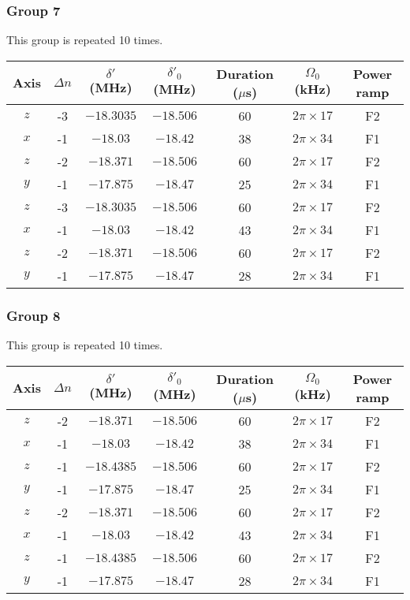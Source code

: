 \documentclass[aps,secnumarabic,amsmath,amssymb]{revtex4}
\begin{document}
\newpage
\subsubsection{Group 7}
This group is repeated 10 times.
\begin{center}
  \begin{tabular}{|c|c|c|c|c|c|c|}
    \hline
    Axis&$\Delta n$&$\delta'$ (MHz)&$\delta'_0$ (MHz)&Duration ($\mu$s)& $\Omega_0$ (kHz)&Power ramp\\\hline
    $z$&-3&$-18.3035$&$-18.506$&60&$2\pi\times17$&F2\\\hline
    $x$&-1&$-18.03$&$-18.42$&38&$2\pi\times34$&F1\\\hline
    $z$&-2&$-18.371$&$-18.506$&60&$2\pi\times17$&F2\\\hline
    $y$&-1&$-17.875$&$-18.47$&25&$2\pi\times34$&F1\\\hline
    $z$&-3&$-18.3035$&$-18.506$&60&$2\pi\times17$&F2\\\hline
    $x$&-1&$-18.03$&$-18.42$&43&$2\pi\times34$&F1\\\hline
    $z$&-2&$-18.371$&$-18.506$&60&$2\pi\times17$&F2\\\hline
    $y$&-1&$-17.875$&$-18.47$&28&$2\pi\times34$&F1\\\hline
  \end{tabular}
\end{center}
\subsubsection{Group 8}
This group is repeated 10 times.
\begin{center}
  \begin{tabular}{|c|c|c|c|c|c|c|}
    \hline
    Axis&$\Delta n$&$\delta'$ (MHz)&$\delta'_0$ (MHz)&Duration ($\mu$s)& $\Omega_0$ (kHz)&Power ramp\\\hline
    $z$&-2&$-18.371$&$-18.506$&60&$2\pi\times17$&F2\\\hline
    $x$&-1&$-18.03$&$-18.42$&38&$2\pi\times34$&F1\\\hline
    $z$&-1&$-18.4385$&$-18.506$&60&$2\pi\times17$&F2\\\hline
    $y$&-1&$-17.875$&$-18.47$&25&$2\pi\times34$&F1\\\hline
    $z$&-2&$-18.371$&$-18.506$&60&$2\pi\times17$&F2\\\hline
    $x$&-1&$-18.03$&$-18.42$&43&$2\pi\times34$&F1\\\hline
    $z$&-1&$-18.4385$&$-18.506$&60&$2\pi\times17$&F2\\\hline
    $y$&-1&$-17.875$&$-18.47$&28&$2\pi\times34$&F1\\\hline
  \end{tabular}
\end{center}
\end{document}
